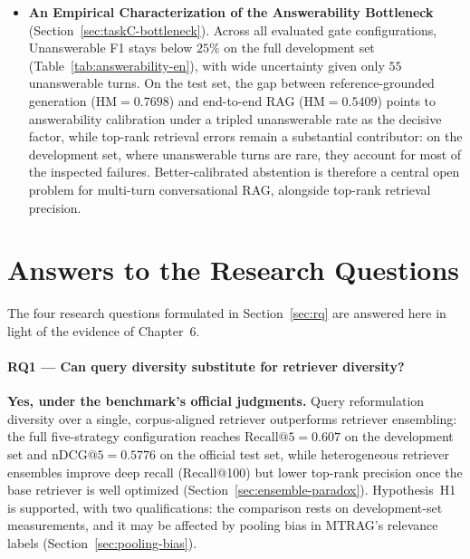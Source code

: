 \begin{itemize}
    \item \textbf{An Empirical Characterization of the Answerability Bottleneck} (Section~\ref{sec:taskC-bottleneck}). Across all evaluated gate configurations, Unanswerable F1 stays below $25\%$ on the full development set (Table~\ref{tab:answerability-en}), with wide uncertainty given only $55$ unanswerable turns. On the test set, the gap between reference-grounded generation ($\text{HM}{=}0.7698$) and end-to-end RAG ($\text{HM}{=}0.5409$) points to answerability calibration under a tripled unanswerable rate as the decisive factor, while top-rank retrieval errors remain a substantial contributor: on the development set, where unanswerable turns are rare, they account for most of the inspected failures. Better-calibrated abstention is therefore a central open problem for multi-turn conversational RAG, alongside top-rank retrieval precision.
\end{itemize}

\section{Answers to the Research Questions}
\label{sec:rq-answers}

The four research questions formulated in Section~\ref{sec:rq} are answered here in light of the evidence of Chapter~6.

\paragraph{RQ1 --- Can query diversity substitute for retriever diversity?}
\textbf{Yes, under the benchmark's official judgments.} Query reformulation diversity over a single, corpus-aligned retriever outperforms retriever ensembling: the full five-strategy configuration reaches $\text{Recall@5}{=}0.607$ on the development set and $\text{nDCG@5}{=}0.5776$ on the official test set, while heterogeneous retriever ensembles improve deep recall (Recall@100) but lower top-rank precision once the base retriever is well optimized (Section~\ref{sec:ensemble-paradox}). Hypothesis~H1 is supported, with two qualifications: the comparison rests on development-set measurements, and it may be affected by pooling bias in MTRAG's relevance labels (Section~\ref{sec:pooling-bias}).

